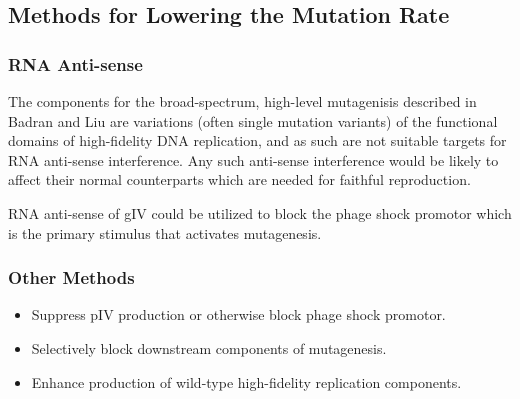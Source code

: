 \documentclass[10pt,letterpaper]{article}
\begin{document}
\subsection{Methods for Lowering the Mutation Rate}
\subsubsection*{RNA Anti-sense}

The components for the broad-spectrum, high-level mutagenisis described in Badran and Liu\cite{mutation} are variations (often single mutation variants) of the functional domains of high-fidelity DNA replication, and as such are not suitable targets for RNA anti-sense interference. Any such anti-sense interference would be likely to affect their normal counterparts which are needed for faithful reproduction.

RNA anti-sense of gIV could be utilized to block the phage shock promotor which is the primary stimulus that activates mutagenesis.

\subsubsection*{Other Methods}
\begin{itemize}
	\item Suppress pIV production or otherwise block phage shock promotor.
	\item Selectively block downstream components of mutagenesis.
	\item Enhance production of wild-type high-fidelity replication components.
\end{itemize}

%

\end{document}
